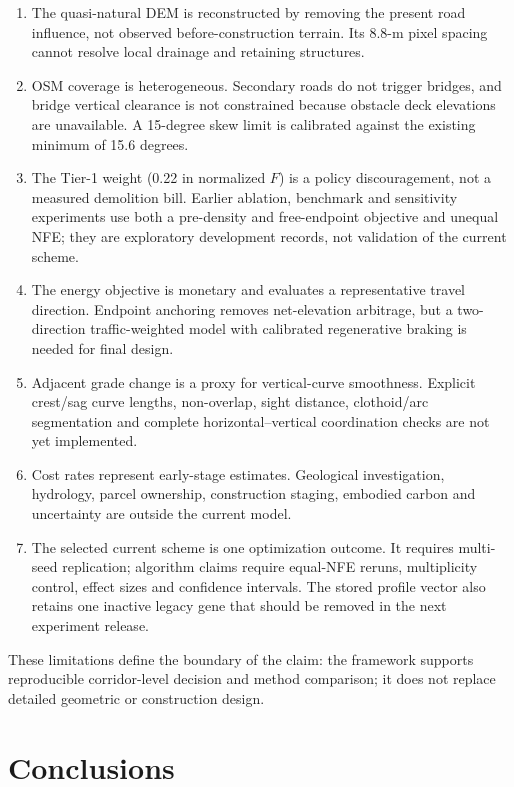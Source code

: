 \documentclass[preprint,12pt]{elsarticle}
\begin{document}
\begin{enumerate}[leftmargin=*,label=(\arabic*)]
\item The quasi-natural DEM is reconstructed by removing the present road influence, not observed before-construction terrain. Its 8.8-m pixel spacing cannot resolve local drainage and retaining structures.
\item OSM coverage is heterogeneous. Secondary roads do not trigger bridges, and bridge vertical clearance is not constrained because obstacle deck elevations are unavailable. A 15-degree skew limit is calibrated against the existing minimum of 15.6 degrees.
\item The Tier-1 weight (0.22 in normalized $F$) is a policy discouragement, not a measured demolition bill. Earlier ablation, benchmark and sensitivity experiments use both a pre-density and free-endpoint objective and unequal NFE; they are exploratory development records, not validation of the current scheme.
\item The energy objective is monetary and evaluates a representative travel direction. Endpoint anchoring removes net-elevation arbitrage, but a two-direction traffic-weighted model with calibrated regenerative braking is needed for final design.
\item Adjacent grade change is a proxy for vertical-curve smoothness. Explicit crest/sag curve lengths, non-overlap, sight distance, clothoid/arc segmentation and complete horizontal--vertical coordination checks are not yet implemented.
\item Cost rates represent early-stage estimates. Geological investigation, hydrology, parcel ownership, construction staging, embodied carbon and uncertainty are outside the current model.
\item The selected current scheme is one optimization outcome. It requires multi-seed replication; algorithm claims require equal-NFE reruns, multiplicity control, effect sizes and confidence intervals. The stored profile vector also retains one inactive legacy gene that should be removed in the next experiment release.
\end{enumerate}

These limitations define the boundary of the claim: the framework supports reproducible corridor-level decision and method comparison; it does not replace detailed geometric or construction design.

\section{Conclusions}
\end{document}
